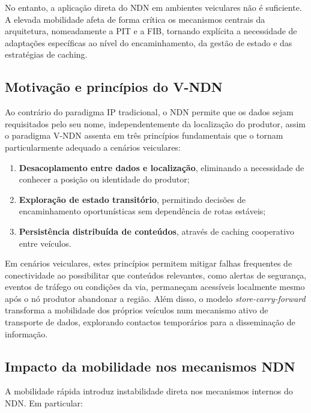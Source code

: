 No entanto, a aplicação direta do \gls{NDN} em ambientes veiculares não é suficiente. A elevada mobilidade afeta de forma crítica os mecanismos centrais da arquitetura, nomeadamente a \gls{PIT} e a \gls{FIB}, tornando explícita a necessidade de adaptações específicas ao nível do encaminhamento, da gestão de estado e das estratégias de caching.

\subsection{Motivação e princípios do V-NDN}
Ao contrário do paradigma IP tradicional, o NDN permite que os dados sejam requisitados pelo seu nome,
independentemente da localização do produtor, assim o paradigma \gls{V-NDN} assenta em três princípios fundamentais que o tornam particularmente adequado a cenários veiculares:

\begin{enumerate}
    \item \textbf{Desacoplamento entre dados e localização}, eliminando a necessidade de conhecer a posição ou identidade do produtor;
    \item \textbf{Exploração de estado transitório}, permitindo decisões de encaminhamento oportunísticas sem dependência de rotas estáveis;
    \item \textbf{Persistência distribuída de conteúdos}, através de caching cooperativo entre veículos.
\end{enumerate}

Em cenários veiculares, estes princípios permitem mitigar falhas frequentes de conectividade ao possibilitar que conteúdos relevantes, como alertas de segurança, eventos de tráfego ou condições da via, permaneçam acessíveis localmente mesmo após o nó produtor abandonar a região. Além disso, o modelo \textit{store-carry-forward} transforma a mobilidade dos próprios veículos num mecanismo ativo de transporte de dados, explorando contactos temporários para a disseminação de informação.

\subsection{Impacto da mobilidade nos mecanismos NDN}

A mobilidade rápida introduz instabilidade direta nos mecanismos internos do \gls{NDN}. Em particular:

